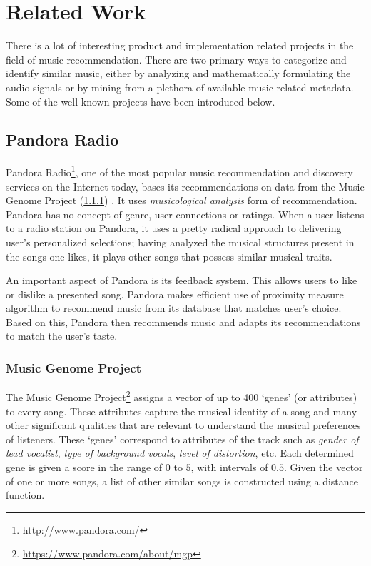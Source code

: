 \chapter{Related Work}
	There is a lot of interesting product and implementation related projects in the field of music recommendation. There are two primary ways to categorize and identify similar music, either by analyzing and mathematically formulating the audio signals or by mining from a plethora of available music related metadata. Some of the well known projects have been introduced below.

	\section{Pandora Radio}
		Pandora Radio\footnote{\url{http://www.pandora.com/}}, one of the most popular music recommendation and discovery services on the Internet today, bases its recommendations on data from the Music Genome Project (\ref{subsec:music_genome}) \cite{john2006pandora}. It uses \emph{musicological analysis} \cite{magno2008comparison} form of recommendation. Pandora has no concept of genre, user connections or ratings. When a user listens to a radio station on Pandora, it uses a pretty radical approach to delivering user’s personalized selections; having analyzed the musical structures present in the songs one likes, it plays other songs that possess similar musical traits.
		
		An important aspect of Pandora is its feedback system. This allows users to like or dislike a presented song. Pandora makes efficient use of proximity measure algorithm \cite{sarwar2000analysis} to recommend music from its database that matches user’s choice. Based on this, Pandora then recommends music and adapts its recommendations to match the user’s taste.
		
		\subsection{Music Genome Project}
		\label{subsec:music_genome}
			The Music Genome Project\footnote{\url{https://www.pandora.com/about/mgp}} \cite{castelluccio2006music} assigns a vector of up to 400 `genes' (or attributes) to every song. These attributes capture the musical identity of a song and many other significant qualities that are relevant to understand the musical preferences of listeners. These `genes' correspond to attributes of the track such as \emph{gender of lead vocalist}, \emph{type of background vocals}, \emph{level of distortion}, etc. Each determined gene is given a score in the range of \(0\) to \(5\), with intervals of \(0.5\). Given the vector of one or more songs, a list of other similar songs is constructed using a distance function.
			
